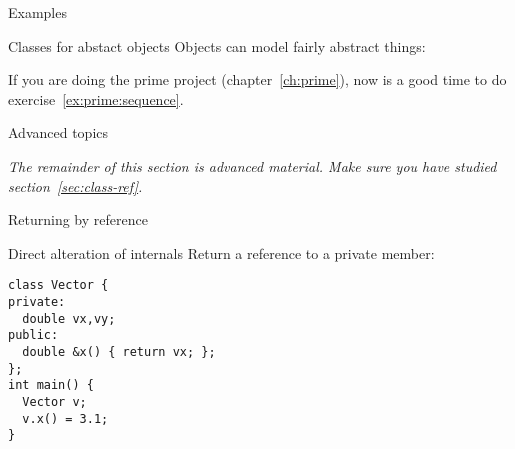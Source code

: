 \begin{comment}
  \Level 1 {Accessors}

  It is a good idea to keep data members private, and use accessor
  functions.

  \begin{exercise}
    \label{ex:geom:twoconstruct}
    Write a \lstinline{Point} class that has two constructors:
    \begin{lstlisting}
      class Point {
        private:
        // data members
        public:
        Point( float x,float y ) { /* ... */ };
        Point( float r,float theta ) { /* ... */ };
        float get_x() { /* ... */ };
        float get_y() { /* ... */ };
        float get_r() { /* ... */ };
        float get_theta() { /* ... */ };
      };
    \end{lstlisting}
    Use $r,\theta$ for the private variables, do not store $x,y$.
  \end{exercise}
\end{comment}

 {Examples}

\begin{block}{Classes for abstact objects}
  \label{sl:intstream}
  Objects can model fairly abstract things:
\end{block}

\begin{exercise}
  If you are doing the prime project (chapter~\ref{ch:prime}),
  now is a good time to do exercise~\ref{ex:prime:sequence}.
\end{exercise}



 {Advanced topics}

\emph{The remainder of this section is advanced material. Make sure
  you have studied section~\ref{sec:class-ref}.}

 {Returning by reference}

\begin{block}{Direct alteration of internals}
  \label{sl:obj-return-ref}
  Return a reference to a private member:
\begin{lstlisting}
class Vector {
private:
  double vx,vy;
public:
  double &x() { return vx; };
};
int main() {
  Vector v;
  v.x() = 3.1;
}
\end{lstlisting}
\end{block}

